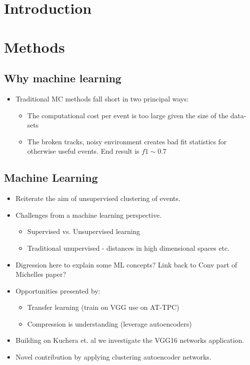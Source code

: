 \documentclass[preprint,12pt]{elsarticle}
\begin{document}
\section{Introduction}\label{sec:intro}

\section{Methods}\label{sec:methods}
\subsection{Why machine learning}

\begin{itemize}
    \item Traditional MC methods fall short in two principal ways:
    \begin{itemize}
        \item The computational cost per event is too large given the size of the data-sets
        \item The broken tracks, noisy environment creates bad fit statistics for otherwise useful events. End result is $f1 \sim 0.7 $
    \end{itemize}
\end{itemize}

\subsection{Machine Learning}

\begin{itemize}
    \item Reiterate the aim of unsupervised  clustering of events.
    \item Challenges from a machine learning perspective. 
    \begin{itemize}
        \item Supervised vs. Unsupervised learning
        \item Traditional unupervised - distances in high dimensional spaces etc. 
    \end{itemize}
    \item Digression here to explain some ML concepts? Link back to Conv part of Michelles paper? 
    \item Opportunities presented by: 
    \begin{itemize}
        \item Transfer learning (train on VGG use on AT-TPC)
        \item Compression is understanding (leverage autoencoders) 
    \end{itemize}
    \item Building on Kuchera et. al we investigate the VGG16 networks application. 
    \item Novel contribution by applying clustering autoencoder networks. 
\end{itemize}
\end{document}
